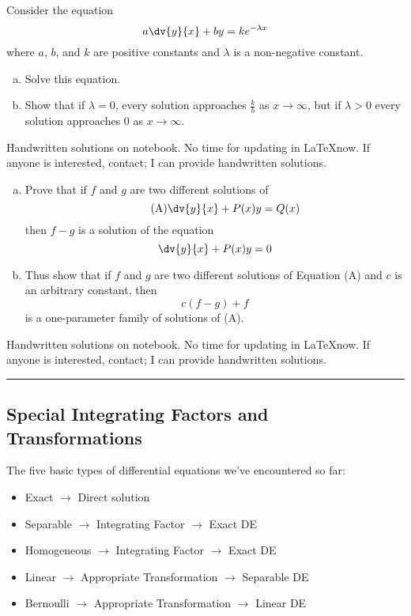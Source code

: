 \begin{exercise}{
    Consider the equation \[
        a\dv{y}{x} + by = ke^{-\lambda x} 
    \] where $a$, $b$, and $k$ are positive constants and $\lambda$ is a non-negative constant.
    \begin{enumerate}[(a)]
        \item Solve this equation.
        \item Show that if $\lambda=0$, every solution approaches $\frac{k}{b}$ as $x \to \infty$, but if $\lambda>0$ every solution approaches $0$ as $x \to \infty$.
    \end{enumerate}
    }{}
    Handwritten solutions on notebook. No time for updating in \LaTeX now. If anyone is interested, contact; I can provide handwritten solutions.
\end{exercise}

\begin{exercise}{
    \begin{enumerate}[(a)]
        \item Prove that if $f$ and $g$ are two different solutions of
        \begin{equation}\tag{A}
            \dv{y}{x} + P(x)y = Q(x)
        \end{equation}
    then $f-g$ is a solution of the equation \[
        \dv{y}{x} + P(x)y = 0
    \]
    \item Thus show that if $f$ and $g$ are two different solutions of Equation (A) and $c$ is an arbitrary constant, then \[
        c(f-g) + f
    \] is a one-parameter family of solutions of (A).
    \end{enumerate}
    }{}
    Handwritten solutions on notebook. No time for updating in \LaTeX now. If anyone is interested, contact; I can provide handwritten solutions.
\end{exercise}


\vspace{20pt}\rule{3in}{1pt}
\subsection{Special Integrating Factors and Transformations}
The five basic types of differential equations we've encountered so far:\\
\begin{itemize}
    \item Exact $ \to $ Direct solution
    \item Separable $ \to $ Integrating Factor $ \to $ Exact DE
    \item Homogeneous $ \to $ Integrating Factor $ \to $ Exact DE
    \item Linear $ \to $ Appropriate Transformation $ \to $ Separable DE
    \item Bernoulli $ \to $ Appropriate Transformation $ \to $ Linear DE
\end{itemize}

